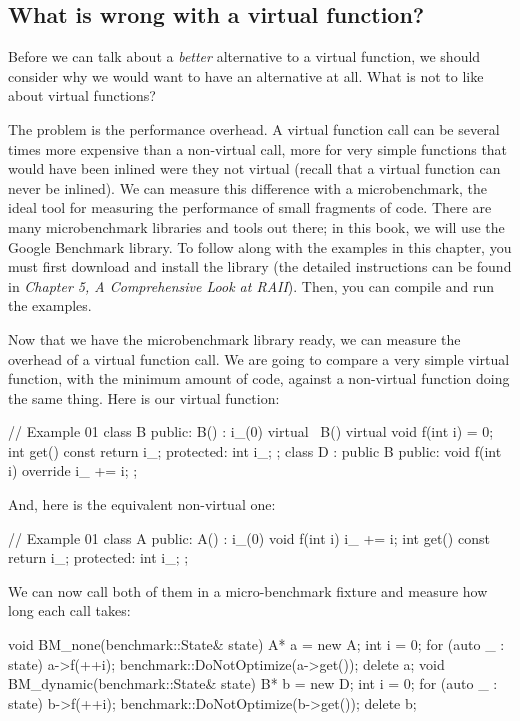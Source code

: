 \subsection{What is wrong with a virtual function?}

Before we can talk about a \emph{better} alternative to a virtual function, we should consider why we would want to have an alternative at all. What is not to like about virtual functions?

The problem is the performance overhead. A virtual function call can be several times more expensive than a non-virtual call, more for very simple functions that would have been inlined were they not virtual (recall that a virtual function can never be inlined). We can measure this difference with a microbenchmark, the ideal tool for measuring the performance of small fragments of code. There are many microbenchmark libraries and tools out there; in this book, we will use the Google Benchmark library. To follow along with the examples in this chapter, you must first download and install the library (the detailed instructions can be found in \emph{Chapter 5, A Comprehensive Look at RAII}). Then, you can compile and run the examples.

Now that we have the microbenchmark library ready, we can measure the overhead of a virtual function call. We are going to compare a very simple virtual function, with the minimum amount of code, against a non-virtual function doing the same thing. Here is our virtual function:

\begin{code}
// Example 01
class B {
  public:
  B() : i_(0) {}
  virtual ~B() {}
  virtual void f(int i) = 0;
  int get() const { return i_; }
  protected:
  int i_;
};
class D : public B {
  public:
  void f(int i) override { i_ += i; }
};
\end{code}

And, here is the equivalent non-virtual one:

\begin{code}
// Example 01
class A {
  public:
  A() : i_(0) {}
  void f(int i) { i_ += i; }
  int get() const { return i_; }
  protected:
  int i_;
};
\end{code}

We can now call both of them in a micro-benchmark fixture and measure how long each call takes:

\begin{code}
void BM_none(benchmark::State& state) {
  A* a = new A;
  int i = 0;
  for (auto _ : state) a->f(++i);
  benchmark::DoNotOptimize(a->get());
  delete a;
}
void BM_dynamic(benchmark::State& state) {
  B* b = new D;
  int i = 0;
  for (auto _ : state) b->f(++i);
  benchmark::DoNotOptimize(b->get());
  delete b;
}
\end{code}

